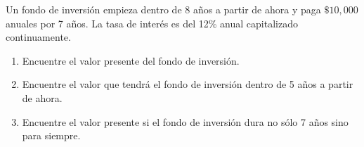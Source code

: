 \item Un fondo de inversión empieza dentro de 8 años a partir de ahora y paga $\$10,000$ anuales por 7 años. La tasa de interés es del 12\% anual capitalizado continuamente.
    \begin{enumerate}
        \item[(a)] Encuentre el valor presente del fondo de inversión.
        \item[(b)] Encuentre el valor que tendrá el fondo de inversión dentro de 5 años a partir de ahora.
        \item[(c)] Encuentre el valor presente si el fondo de inversión dura no sólo 7 años sino para siempre.
    \end{enumerate}
